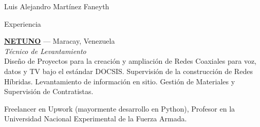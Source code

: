 \documentclass[10pt,letterpaper]{article}
\begin{document}
\begin{cv}{Luis Alejandro Mart\'inez Faneyth}
\begin{cvlist}{Experiencia}
{	\parbox[t]{\linewidth}{
		\textbf{\href{https://www.netuno.net}{NETUNO}} --- Maracay, Venezuela\\
		\textit{T\'ecnico de Levantamiento}\\
		\footnotesize{Dise\~no de Proyectos para la creaci\'on y ampliaci\'on de Redes Coaxiales para voz, datos y TV bajo el est\'andar DOCSIS. Supervisi\'on de la construcci\'on de Redes H\'ibridas. Levantamiento de informaci\'on en sitio. Gesti\'on de Materiales y Supervisi\'on de Contratistas.}
	}
}
\item[{\parbox[t]{6em}{\textit{\large{Otra\\experiencia}}}}]{
	\parbox[t]{\linewidth}{
		\footnotesize{Freelancer en Upwork (mayormente desarrollo en Python), Profesor en la Universidad Nacional Experimental de la Fuerza Armada.}
	}
}
\end{cvlist}


\end{cv}
\end{document}
